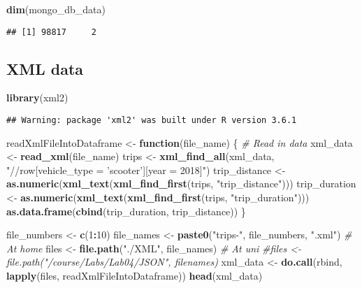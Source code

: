 \documentclass[]{article}
\newenvironment{Shaded}{\begin{snugshade}}{\end{snugshade}}
\newcommand{\KeywordTok}[1]{\textcolor[rgb]{0.13,0.29,0.53}{\textbf{#1}}}
\newcommand{\DecValTok}[1]{\textcolor[rgb]{0.00,0.00,0.81}{#1}}
\newcommand{\StringTok}[1]{\textcolor[rgb]{0.31,0.60,0.02}{#1}}
\newcommand{\CommentTok}[1]{\textcolor[rgb]{0.56,0.35,0.01}{\textit{#1}}}
\newcommand{\ControlFlowTok}[1]{\textcolor[rgb]{0.13,0.29,0.53}{\textbf{#1}}}
\newcommand{\OperatorTok}[1]{\textcolor[rgb]{0.81,0.36,0.00}{\textbf{#1}}}
\newcommand{\NormalTok}[1]{#1}
\begin{document}
\begin{Shaded}
\begin{Highlighting}[]
\KeywordTok{dim}\NormalTok{(mongo_db_data)}
\end{Highlighting}
\end{Shaded}

\begin{verbatim}
## [1] 98817     2
\end{verbatim}

\subsection{XML data}\label{xml-data}

\begin{Shaded}
\begin{Highlighting}[]
\KeywordTok{library}\NormalTok{(xml2)}
\end{Highlighting}
\end{Shaded}

\begin{verbatim}
## Warning: package 'xml2' was built under R version 3.6.1
\end{verbatim}

\begin{Shaded}
\begin{Highlighting}[]
\NormalTok{readXmlFileIntoDataframe <-}\StringTok{ }\ControlFlowTok{function}\NormalTok{(file_name) \{}
  \CommentTok{# Read in data}
\NormalTok{  xml_data <-}\StringTok{ }\KeywordTok{read_xml}\NormalTok{(file_name)}
\NormalTok{  trips <-}\StringTok{ }\KeywordTok{xml_find_all}\NormalTok{(xml_data, }\StringTok{"//row[vehicle_type = 'scooter'][year = 2018]"}\NormalTok{)}
\NormalTok{  trip_distance <-}\StringTok{ }\KeywordTok{as.numeric}\NormalTok{(}\KeywordTok{xml_text}\NormalTok{(}\KeywordTok{xml_find_first}\NormalTok{(trips, }\StringTok{"trip_distance"}\NormalTok{)))}
\NormalTok{  trip_duration <-}\StringTok{ }\KeywordTok{as.numeric}\NormalTok{(}\KeywordTok{xml_text}\NormalTok{(}\KeywordTok{xml_find_first}\NormalTok{(trips, }\StringTok{"trip_duration"}\NormalTok{)))}
  \KeywordTok{as.data.frame}\NormalTok{(}\KeywordTok{cbind}\NormalTok{(trip_duration, trip_distance))}
\NormalTok{\}}


\NormalTok{file_numbers <-}\StringTok{ }\KeywordTok{c}\NormalTok{(}\DecValTok{1}\OperatorTok{:}\DecValTok{10}\NormalTok{)}
\NormalTok{file_names <-}\StringTok{ }\KeywordTok{paste0}\NormalTok{(}\StringTok{"trips-"}\NormalTok{, file_numbers, }\StringTok{".xml"}\NormalTok{)}
\CommentTok{# At home}
\NormalTok{files <-}\StringTok{ }\KeywordTok{file.path}\NormalTok{(}\StringTok{"./XML"}\NormalTok{, file_names)}
\CommentTok{# At uni}
\CommentTok{#files <- file.path("/course/Labs/Lab04/JSON", filenames)}
\NormalTok{xml_data <-}\StringTok{ }\KeywordTok{do.call}\NormalTok{(rbind, }\KeywordTok{lapply}\NormalTok{(files, readXmlFileIntoDataframe))}
\KeywordTok{head}\NormalTok{(xml_data)}
\end{Highlighting}
\end{Shaded}
\end{document}
